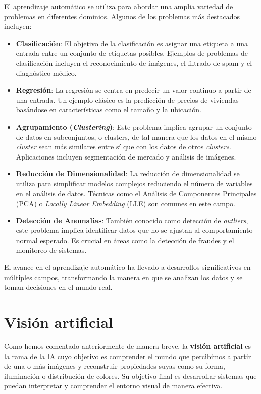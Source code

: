 El aprendizaje automático se utiliza para abordar una amplia variedad de problemas en diferentes dominios. Algunos de los problemas más destacados incluyen:

\begin{itemize}
	\item \textbf{Clasificación}: El objetivo de la clasificación es asignar una etiqueta a una entrada entre un conjunto de etiquetas posibles. Ejemplos de problemas de clasificación incluyen el reconocimiento de imágenes, el filtrado de spam y el diagnóstico médico.
	
	\item \textbf{Regresión}: La regresión se centra en predecir un valor continuo a partir de una entrada. Un ejemplo clásico es la predicción de precios de viviendas basándose en características como el tamaño y la ubicación.
	
	\item \textbf{Agrupamiento (\textit{Clustering})}: Este problema implica agrupar un conjunto de datos en subconjuntos, o clusters, de tal manera que los datos en el mismo \textit{cluster} sean más similares entre sí que con los datos de otros \textit{clusters}. Aplicaciones incluyen segmentación de mercado y análisis de imágenes.
	
	\item \textbf{Reducción de Dimensionalidad}: La reducción de dimensionalidad se utiliza para simplificar modelos complejos reduciendo el número de variables en el análisis de datos. Técnicas como el Análisis de Componentes Principales (PCA) o \textit{Locally Linear Embedding} (LLE) son comunes en este campo.
	
	\item \textbf{Detección de Anomalías}: También conocido como detección de \textit{outliers}, este problema implica identificar datos que no se ajustan al comportamiento normal esperado. Es crucial en áreas como la detección de fraudes y el monitoreo de sistemas.
\end{itemize}

El avance en el aprendizaje automático ha llevado a desarrollos significativos en múltiples campos, transformando la manera en que se analizan los datos y se toman decisiones en el mundo real.

\section{Visión artificial}

Como hemos comentado anteriormente de manera breve, la \textbf{visión artificial} es la rama de la IA cuyo objetivo es comprender el mundo que percibimos a partir de una o más imágenes y reconstruir propiedades suyas como su forma, iluminación o distribución de colores. Su objetivo final es desarrollar sistemas que puedan interpretar y comprender el entorno visual de manera efectiva.

